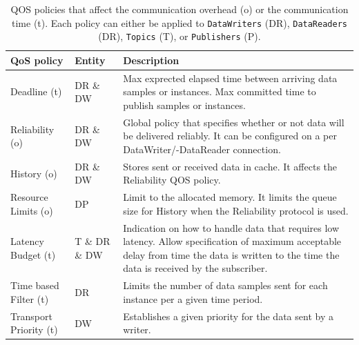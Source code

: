 \begin{table}[h!]
	\begin{center}
		\caption{\Gls*{QOS} policies that affect the communication overhead (o) or the communication time (t). Each  policy can either be applied to \texttt{DataWriters} (DR), \texttt{DataReaders} (DR), \texttt{Topics} (T), or \texttt{Publishers} (P).}
		\label{tab:qos_garciavalls}
		\begin{tabularx}{\textwidth}{|l|l|X|}
			\hline
			\textbf{QoS policy} & \textbf{Entity} & \textbf{Description}\\
			\hline \hline
			Deadline (t) & DR \& DW & Max exprected elapsed time between arriving data samples or instances. Max committed time to publish samples or instances.\\
			\hline
			Reliability (o) & DR \& DW & Global policy that specifies whether or not data will be delivered reliably. It can be configured on a per DataWriter/-DataReader connection. \\
			\hline
			History (o) & DR \& DW & Stores sent or received data in cache. It affects the Reliability \gls*{QOS} policy. \\
			\hline
			Resource Limits (o) & DP & Limit to the allocated memory. It limits the queue size for History when the Reliability protocol is used. \\
			\hline
			Latency Budget (t) & T \& DR \& DW & Indication on how to handle data that requires low latency. Allow specification of maximum acceptable delay from time the data is written to the time the data is received by the subscriber. \\
			\hline
			Time based Filter (t) & DR & Limits the number of data samples sent for each instance per a given time period. \\
			\hline
			Transport Priority (t) & DW & Establishes a given priority for the data sent by a writer.\\
			\hline
		\end{tabularx}
	\end{center}
\end{table}

